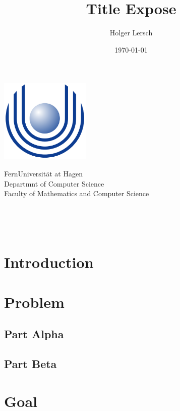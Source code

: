 \documentclass[a4paper,oneside,11pt]{article}
\title{Title Expose}
\author{Holger Lersch}
\date{\today}
\begin{document}
\begin{titlingpage} %
\begin{center}
\includegraphics[height=4cm]{images/Uni_hagen_logo}\\ %
\begin{large}
FernUniversit\"at at Hagen \\ %
Departmnt of Computer Science\\
Faculty of Mathematics and Computer Science\\
\end{large}
\vspace{4cm} %
\begin{large} 
\textbf{\thetitle} \\
\end{large}
\theauthor\\
\vspace{7cm} %
\thedate
\end{center}
\end{titlingpage}

\section{Introduction}


\section{Problem}

\subsection{Part Alpha}

\subsection{Part Beta}


\section{Goal}
\end{document}
